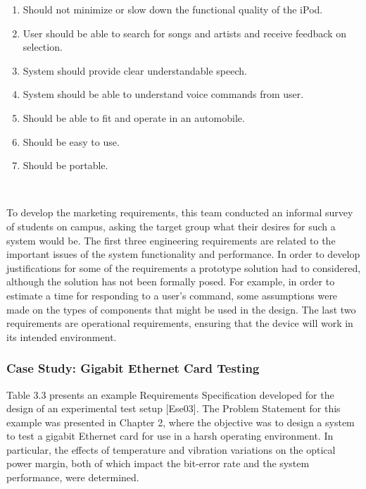 \begin{longtable}[]
{\begin{minipage}[t]{\linewidth}
\begin{enumerate}
\def\labelenumi{\arabic{enumi}.}
\item
  Should not minimize or slow down the functional quality of the iPod.
\item
  User should be able to search for songs and artists and receive
  feedback on selection.
\item
  System should provide clear understandable speech.
\item
  System should be able to understand voice commands from user.
\item
  Should be able to fit and operate in an automobile.
\item
  Should be easy to use.
\item
  Should be portable.
\end{enumerate}
\end{minipage}} \\
\end{longtable}

To develop the marketing requirements, this team conducted an informal
survey of students on campus, asking the target group what their desires
for such a system would be. The first three engineering requirements are
related to the important issues of the system functionality and
performance. In order to develop justifications for some of the
requirements a prototype solution had to considered, although the
solution has not been formally posed. For example, in order to estimate
a time for responding to a user's command, some assumptions were made on
the types of components that might be used in the design. The last two
requirements are operational requirements, ensuring that the device will
work in its intended environment.

\subsubsection{Case Study: Gigabit Ethernet Card
Testing}\label{case-study-gigabit-ethernet-card-testing}

Table 3.3 presents an example Requirements Specification developed for
the design of an experimental test setup {[}Ese03{]}. The Problem
Statement for this example was presented in Chapter 2, where the
objective was to design a system to test a gigabit Ethernet card for use
in a harsh operating environment. In particular, the effects of
temperature and vibration variations on the optical power margin, both
of which impact the bit-error rate and the system performance, were
determined.

